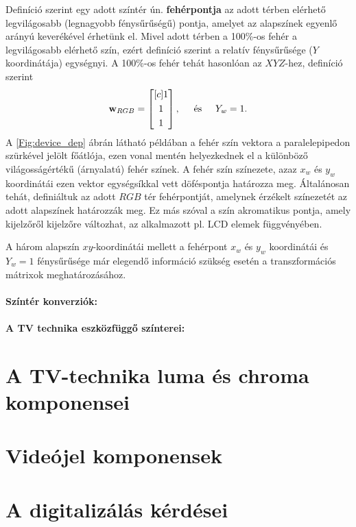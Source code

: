 Definíció szerint egy adott színtér ún. \textbf{fehérpontja} az adott térben elérhető legvilágosabb (legnagyobb fénysűrűségű) pontja, amelyet az alapszínek egyenlő arányú keverékével érhetünk el.
Mivel adott térben a 100\%-os fehér a legvilágosabb elérhető szín, ezért definíció szerint a relatív fénysűrűsége ($Y$ koordinátája) egységnyi.
A 100\%-os fehér tehát hasonlóan az $XYZ$-hez, definíció szerint 
\begin{equation}
\mathbf{w}_{RGB} = \begin{bmatrix}[c]
       1 \\[0.3em]
       1 \\[0.3em]
       1 \end{bmatrix}, \hspace{5mm} \text{és} \hspace{5mm} 
Y_w = 1.
\end{equation}
A \ref{Fig:device_dep} ábrán látható példában a fehér szín vektora a paralelepipedon szürkével jelölt főátlója, ezen vonal mentén helyezkednek el a különböző világosságértékű (árnyalatú) fehér színek.
A fehér szín színezete, azaz $x_w$ és $y_w$ koordinátái ezen vektor egységsíkkal vett döféspontja határozza meg.
Általánosan tehát, definiáltuk az adott $RGB$ tér fehérpontját, amelynek érzékelt színezetét az adott alapszínek határozzák meg.
Ez más szóval a szín akromatikus pontja, amely kijelzőről kijelzőre változhat, az alkalmazott pl. LCD elemek függvényében.

A három alapszín $xy$-koordinátái mellett a fehérpont $x_w$ és $y_w$ koordinátái és $Y_w = 1$ fénysűrűsége már elegendő információ szükség esetén a transzformációs mátrixok meghatározásához.

\paragraph{Színtér konverziók:\\}

\paragraph{A TV technika eszközfüggő színterei:\\}


\section{A TV-technika luma és chroma komponensei}

\section{Videójel komponensek}

\section{A digitalizálás kérdései}